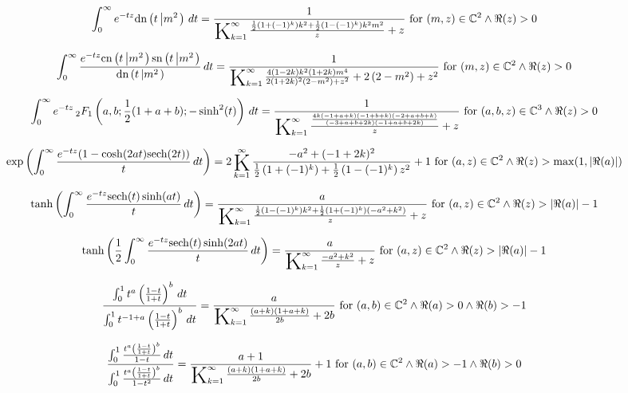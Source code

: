 \documentclass{article}
\newcommand{\bigK}{\mathop{\raisebox{-5pt}{\huge K}}}
\begin{document}
\[\int_0^{\infty } e^{-t z} \text{dn}\left(t\left|m^2\right.\right) \, dt=\frac{1}{\bigK_{k=1}^{\infty}\frac{\frac{1}{2} \left(1+(-1)^k\right) k^2+\frac{1}{2} \left(1-(-1)^k\right) k^2 m^2}{z}+z}\text{ for }(m,z)\in \mathbb{C}^2\land \Re(z)>0\] 

\[\int_0^{\infty } \frac{e^{-t z} \text{cn}\left(t\left|m^2\right.\right) \text{sn}\left(t\left|m^2\right.\right)}{\text{dn}\left(t\left|m^2\right.\right)} \, dt=\frac{1}{\bigK_{k=1}^{\infty}\frac{4 (1-2 k) k^2 (1+2 k) m^4}{2 (1+2 k)^2 \left(2-m^2\right)+z^2}+2 \left(2-m^2\right)+z^2}\text{ for }(m,z)\in \mathbb{C}^2\land \Re(z)>0\] 

\[\int_0^{\infty } e^{-t z} \, _2F_1\left(a,b;\frac{1}{2} (1+a+b);-\sinh ^2(t)\right) \, dt=\frac{1}{\bigK_{k=1}^{\infty}\frac{\frac{4 k (-1+a+k) (-1+b+k) (-2+a+b+k)}{(-3+a+b+2 k) (-1+a+b+2 k)}}{z}+z}\text{ for }(a,b,z)\in \mathbb{C}^3\land \Re(z)>0\] 

\[\exp \left(\int_0^{\infty } \frac{e^{-t z} (1-\cosh (2 a t) \text{sech}(2 t))}{t} \, dt\right)=2 \bigK_{k=1}^{\infty}\frac{-a^2+(-1+2 k)^2}{\frac{1}{2} \left(1+(-1)^k\right)+\frac{1}{2} \left(1-(-1)^k\right) z^2}+1\text{ for }(a,z)\in \mathbb{C}^2\land \Re(z)>\max (1,\left| \Re(a)\right| )\] 

\[\tanh \left(\int_0^{\infty } \frac{e^{-t z} \text{sech}(t) \sinh (a t)}{t} \, dt\right)=\frac{a}{\bigK_{k=1}^{\infty}\frac{\frac{1}{2} \left(1-(-1)^k\right) k^2+\frac{1}{2} \left(1+(-1)^k\right) \left(-a^2+k^2\right)}{z}+z}\text{ for }(a,z)\in \mathbb{C}^2\land \Re(z)>\left| \Re(a)\right| -1\] 

\[\tanh \left(\frac{1}{2} \int_0^{\infty } \frac{e^{-t z} \text{sech}(t) \sinh (2 a t)}{t} \, dt\right)=\frac{a}{\bigK_{k=1}^{\infty}\frac{-a^2+k^2}{z}+z}\text{ for }(a,z)\in \mathbb{C}^2\land \Re(z)>\left| \Re(a)\right| -1\] 

\[\frac{\int_0^1 t^a \left(\frac{1-t}{1+t}\right)^b \, dt}{\int_0^1 t^{-1+a} \left(\frac{1-t}{1+t}\right)^b \, dt}=\frac{a}{\bigK_{k=1}^{\infty}\frac{(a+k) (1+a+k)}{2 b}+2 b}\text{ for }(a,b)\in \mathbb{C}^2\land \Re(a)>0\land \Re(b)>-1\] 

\[\frac{\int_0^1 \frac{t^a \left(\frac{1-t}{1+t}\right)^b}{1-t} \, dt}{\int_0^1 \frac{t^a \left(\frac{1-t}{1+t}\right)^b}{1-t^2} \, dt}=\frac{a+1}{\bigK_{k=1}^{\infty}\frac{(a+k) (1+a+k)}{2 b}+2 b}+1\text{ for }(a,b)\in \mathbb{C}^2\land \Re(a)>-1\land \Re(b)>0\] 
\end{document}
